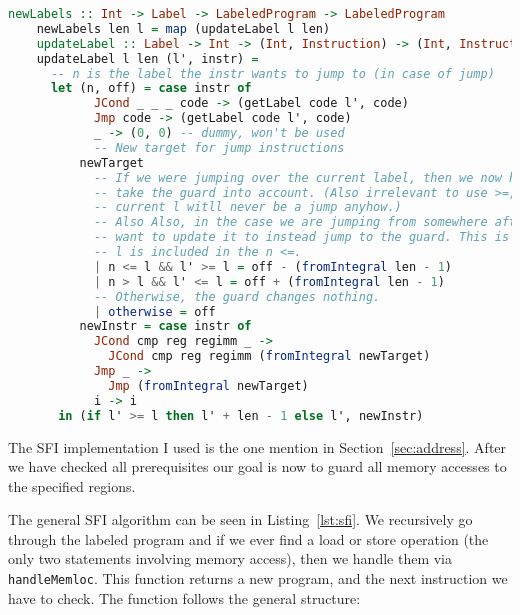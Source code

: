 \begin{lstlisting}[language={haskell}, caption={SFI algorithm}, label={lst:sfi}]
    newLabels :: Int -> Label -> LabeledProgram -> LabeledProgram
    newLabels len l = map (updateLabel l len)
    updateLabel :: Label -> Int -> (Int, Instruction) -> (Int, Instruction)
    updateLabel l len (l', instr) =
      -- n is the label the instr wants to jump to (in case of jump)
      let (n, off) = case instr of
            JCond _ _ _ code -> (getLabel code l', code)
            Jmp code -> (getLabel code l', code)
            _ -> (0, 0) -- dummy, won't be used
            -- New target for jump instructions
          newTarget
            -- If we were jumping over the current label, then we now have to
            -- take the guard into account. (Also irrelevant to use >=, as the
            -- current l witll never be a jump anyhow.)
            -- Also Also, in the case we are jumping from somewhere after, we
            -- want to update it to instead jump to the guard. This is why n ==
            -- l is included in the n <=.
            | n <= l && l' >= l = off - (fromIntegral len - 1)
            | n > l && l' <= l = off + (fromIntegral len - 1)
            -- Otherwise, the guard changes nothing.
            | otherwise = off
          newInstr = case instr of
            JCond cmp reg regimm _ ->
              JCond cmp reg regimm (fromIntegral newTarget)
            Jmp _ ->
              Jmp (fromIntegral newTarget)
            i -> i
       in (if l' >= l then l' + len - 1 else l', newInstr)
\end{lstlisting}
The SFI implementation I used is the one mention in Section~\ref{sec:address}.
After we have checked all prerequisites our goal is now to guard all memory
accesses to the specified regions.

The general SFI algorithm can be seen in Listing~\ref{lst:sfi}. We recursively
go through the labeled program and if we ever find a load or store operation
(the only two statements involving memory access), then we handle them via
\texttt{handleMemloc}. This function returns a new program, and the next
instruction we have to check. The function follows the general structure:

